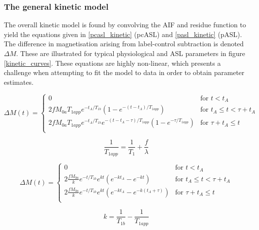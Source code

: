 \documentclass[12pt]{report}
\begin{document}
\subsubsection{The general kinetic model}

The overall kinetic model is found by convolving the AIF and residue function to yield the equations given in \ref{pcasl_kinetic} (pcASL) and \ref{pasl_kinetic} (pASL). The difference in magnetisation arising from label-control subtraction is denoted $\Delta M$. These are illustrated for typical physiological and ASL parameters in figure \ref{kinetic_curves}. These equations are highly non-linear, which presents a challenge when attempting to fit the model to data in order to obtain parameter estimates. 

\begin{equation}
  \Delta M(t) =
  \begin{cases}
    0 & \text{for } t < t_{A} \\
    2 f M_{0a} T_{1app} e^{-t_{A}/T_{1b}} (1 - e^{-(t-t_A)/T_{1app}}) & \text{for } t_{A} \leq t < \tau + t_{A} \\
    2 f M_{0a} T_{1app} e^{-t_{A}/T_{1b}} e^{-(t - t_A - \tau)/T_{1app}} (1 - e^{-\tau/T_{1app}}) & \text{for } \tau + t_{A} \leq t \\
  \end{cases}
  \label{pcasl_kinetic}
\end{equation}

\begin{equation}
\frac{1}{T_{1app}} = \frac{1}{T_1} + \frac{f}{\lambda}
\end{equation}

\begin{equation}
  \Delta M(t) =
  \begin{cases}
    0 & \text{for } t < t_{A} \\
    2 \frac{f M_{0a}}{k} e^{-t/T_{1b}} e^{kt} (e^{-kt_{A}} - e^{-kt}) & \text{for } t_{A} \leq t < \tau + t_{A} \\
    2 \frac{f M_{0a}}{k} e^{-t/T_{1b}} e^{kt} (e^{-kt_{A}} - e^{-k(t_A + \tau)}) & \text{for } \tau + t_{A} \leq t \\
  \end{cases}
  \label{pasl_kinetic}
\end{equation}

\begin{equation}
k = \frac{1}{T_{1b}} - \frac{1}{T_{1app}}
\end{equation}
\end{document}
